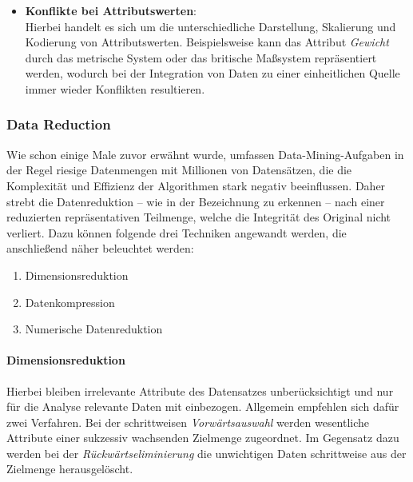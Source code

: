 \begin{itemize}
\item \textbf{Konflikte bei Attributswerten}:
\\ Hierbei handelt es sich um die unterschiedliche Darstellung, Skalierung und Kodierung von Attributswerten. Beispielsweise kann das Attribut \textit{Gewicht} durch das metrische System oder das britische Maßsystem repräsentiert werden, wodurch bei der Integration von Daten zu einer einheitlichen Quelle immer wieder Konflikten resultieren. 
\end{itemize}

\subsubsection{Data Reduction}
\label{dr}
Wie schon einige Male zuvor erwähnt wurde, umfassen Data-Mining-Aufgaben in der Regel riesige Datenmengen mit Millionen von Datensätzen, die die Komplexität und Effizienz der Algorithmen stark negativ beeinflussen. Daher strebt die Datenreduktion -- wie in der Bezeichnung zu erkennen -- nach einer reduzierten repräsentativen Teilmenge, welche die Integrität des Original nicht verliert. Dazu können folgende drei Techniken angewandt werden, die anschließend näher beleuchtet werden: 

\begin{enumerate}

\item Dimensionsreduktion 

\item Datenkompression

\item Numerische Datenreduktion

\end{enumerate}

\paragraph{Dimensionsreduktion}
Hierbei bleiben irrelevante Attribute des Datensatzes unberücksichtigt und nur für die Analyse relevante Daten mit einbezogen. Allgemein empfehlen sich dafür zwei Verfahren. Bei der schrittweisen \textit{Vorwärtsauswahl} werden wesentliche Attribute einer sukzessiv wachsenden Zielmenge zugeordnet. Im Gegensatz dazu werden bei der \textit{Rückwärtseliminierung} die unwichtigen Daten schrittweise aus der Zielmenge herausgelöscht. 

